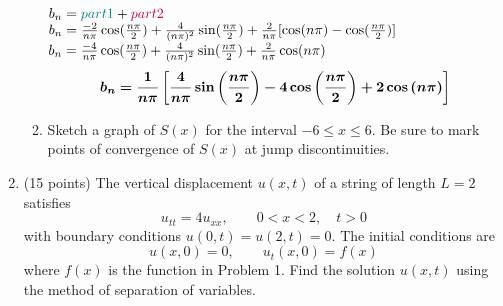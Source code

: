 \documentclass{article}
\begin{document}
\begin{enumerate}
\begin{enumerate}
$b_n = \textcolor{teal}{part 1} + \textcolor{purple}{part 2}$\\
$b_n = {-2\over n\pi}\cos({n\pi \over 2})+ {4\over (n\pi)^2}\sin({n\pi\over 2}) + {2 \over n\pi}[\cos({n\pi}) - \cos({n\pi \over 2})]$\\
$b_n = {-4\over n\pi}\cos({n\pi \over 2})+ {4\over (n\pi)^2}\sin({n\pi\over 2}) + {2 \over n\pi}\cos({n\pi})$\\
\[
\bm{b_n = {1\over n\pi}\left[{4\over n\pi}\sin\left({n\pi\over 2}\right) - 4\cos\left({n\pi \over 2}\right) + 2\cos\left({n\pi}\right) \right]}
\]
\item Sketch a graph of $S(x)$ for the interval $-6\le x\le6$.  Be sure to mark points of convergence of $S(x)$ at jump discontinuities.\\


\end{enumerate}



\newpage
\item (15 points)  The vertical displacement $u(x,t)$ of a string of length $L=2$ satisfies
\[
u_{tt}=4u_{xx},\qquad 0<x<2,\quad t>0
\]
with boundary conditions $u(0,t)=u(2,t)=0$.  The initial conditions are
\[
u(x,0)=0,\qquad u_t(x,0)=f(x)
\]
where $f(x)$ is the function in Problem 1.  Find the solution $u(x,t)$ using the method of separation of variables.\\


\end{enumerate}
\end{document}
